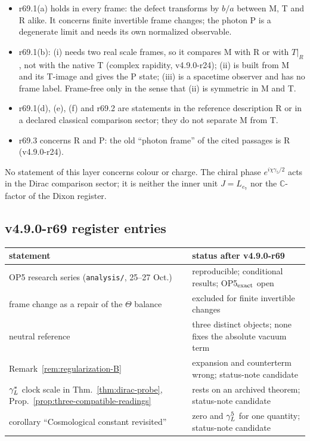 \begin{itemize}[leftmargin=2em]
\item r69.1(a) holds in every frame: the defect transforms by \(b/a\) between M, T and R alike.  It concerns finite invertible frame changes; the
photon P is a degenerate limit and needs its own normalized observable.
\item r69.1(b): (i) needs two real scale frames, so it compares M with R or with \(T|_R\), not with the native T (complex rapidity, v4.9.0-r24); (ii) is built
from M and its T-image and gives the P state; (iii) is a spacetime observer and has no frame label.  Frame-free only in the sense that (ii) is symmetric
in M and T.
\item r69.1(d), (e), (f) and r69.2 are statements in the reference description R or in a declared classical comparison sector; they do not separate M
from T.
\item r69.3 concerns R and P: the old ``photon frame'' of the cited passages is R (v4.9.0-r24).
\end{itemize}
No statement of this layer concerns colour or charge.  The chiral phase \(e^{i\chi\gamma_5/2}\) acts in the Dirac comparison sector; it is neither the inner
unit \(J=L_{e_7}\) nor the \(\mathbb C\)-factor of the Dixon register.

\subsection*{v4.9.0-r69 register entries}
\label{subsec:v490-r69-register}

\begin{center}
\small
\begin{tabular}{@{}>{\raggedright\arraybackslash}p{}>{\raggedright\arraybackslash}p{}@{}}
\toprule
statement & status after v4.9.0-r69\\
\midrule
OP5 research series (\texttt{analysis/}, 25--27 Oct.) & reproducible; conditional results; OP5\(_{\rm exact}\) open\\
frame change as a repair of the \(\Theta\) balance & excluded for finite invertible changes\\
neutral reference & three distinct objects; none fixes the absolute vacuum term\\
Remark~\ref{rem:regularization-B} & expansion and counterterm wrong; status-note candidate\\
\(\gamma_L^*\) clock scale in Thm.~\ref{thm:dirac-probe}, Prop.~\ref{prop:three-compatible-readings} & rests on an archived theorem; status-note candidate\\
corollary ``Cosmological constant revisited'' & zero and \(\gamma_L^5\) for one quantity; status-note candidate\\
\bottomrule
\end{tabular}
\end{center}

